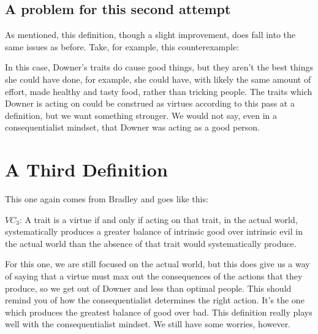 \subsection{A problem for this second attempt}
As mentioned, this definition, though a slight improvement, does fall into the same issues as before. Take, for example, this counterexample:


In this case, Downer’s traits do cause good things, but they aren’t the best things she could have done, for example, she could have, with likely the same amount of effort, made healthy and tasty food, rather than tricking people. The traits which Downer is acting on could be construed as virtues according to this pass at a definition, but we want something stronger. We would not say, even in a consequentialist mindset, that Downer was acting as a good person.

\section{A Third Definition}

This one again comes from Bradley and goes like this:
\begin{center}
$VC_3$: A trait is a virtue if and only if acting on that trait, in the actual world, systematically produces a greater balance of intrinsic good over intrinsic evil in the actual world than the absence of that trait would systematically produce.
\end{center}
For this one, we are still focused on the actual world, but this does give us a way of saying that a virtue must max out the consequences of the actions that they produce, so we get out of Downer and less than optimal people. This should remind you of how the consequentialist determines the right action. It's the one which produces the greatest balance of good over bad. This definition really plays well with the consequentialist mindset. We still have some worries, however.


